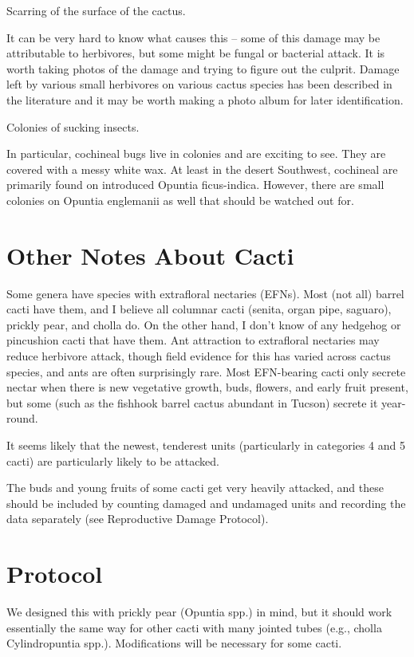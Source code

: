 \documentclass[
  letterpaper,
  oneside,
  open=any]{scrbook}
\begin{document}
Scarring of the surface of the cactus.

It can be very hard to know what causes this -- some of this damage may
be attributable to herbivores, but some might be fungal or bacterial
attack. It is worth taking photos of the damage and trying to figure out
the culprit. Damage left by various small herbivores on various cactus
species has been described in the literature and it may be worth making
a photo album for later identification.

Colonies of sucking insects.

In particular, cochineal bugs live in colonies and are exciting to see.
They are covered with a messy white wax. At least in the desert
Southwest, cochineal are primarily found on introduced Opuntia
ficus-indica. However, there are small colonies on Opuntia englemanii as
well that should be watched out for.

\section{Other Notes About Cacti}\label{other-notes-about-cacti}

Some genera have species with extrafloral nectaries (EFNs). Most (not
all) barrel cacti have them, and I believe all columnar cacti (senita,
organ pipe, saguaro), prickly pear, and cholla do. On the other hand, I
don't know of any hedgehog or pincushion cacti that have them. Ant
attraction to extrafloral nectaries may reduce herbivore attack, though
field evidence for this has varied across cactus species, and ants are
often surprisingly rare. Most EFN-bearing cacti only secrete nectar when
there is new vegetative growth, buds, flowers, and early fruit present,
but some (such as the fishhook barrel cactus abundant in Tucson) secrete
it year-round.

It seems likely that the newest, tenderest units (particularly in
categories 4 and 5 cacti) are particularly likely to be attacked.

The buds and young fruits of some cacti get very heavily attacked, and
these should be included by counting damaged and undamaged units and
recording the data separately (see Reproductive Damage Protocol).

\section{Protocol}\label{protocol-1}

We designed this with prickly pear (Opuntia spp.) in mind, but it should
work essentially the same way for other cacti with many jointed tubes
(e.g., cholla Cylindropuntia spp.). Modifications will be necessary for
some cacti.
\end{document}
